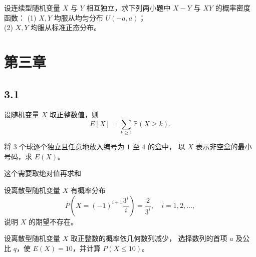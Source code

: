 \begin{homework}[2.63]
设连续型随机变量 $X$ 与 $Y$ 相互独立，求下列两小题中 $X-Y$ 与 $XY$ 的概率密度函数：  
(1) $X,Y$ 均服从均匀分布 $U(-a,a)$；\\
(2) $X,Y$ 均服从标准正态分布。
\end{homework}
\section{第三章}
\subsection*{3.1}
\begin{dxtips}
设随机变量 $X$ 取正整数值，则
\[
E[X]=\sum_{k\ge 1}\mathbb P(X\ge k).
\]

\end{dxtips}
\begin{homework}[3.3]
将 $3$ 个球逐个独立且任意地放入编号为 $1$ 至 $4$ 的盒中，
以 $X$ 表示非空盒的最小号码，求 $E(X)$。
\end{homework}
\begin{dxtips}
    这个需要取绝对值再求和
\end{dxtips}
\begin{homework}[3.4]
设离散型随机变量 $X$ 有概率分布
\[
P\!\left(X=(-1)^{i+1}\frac{3^i}{i}\right)=\frac{2}{3^i},\quad i=1,2,\ldots,
\]
说明 $X$ 的期望不存在。
\end{homework}

\begin{homework}[3.7]
设离散型随机变量 $X$ 取正整数的概率依几何数列减少，
选择数列的首项 $a$ 及公比 $q$，使 $E(X)=10$，并计算 $P(X\le 10)$。
\end{homework}


